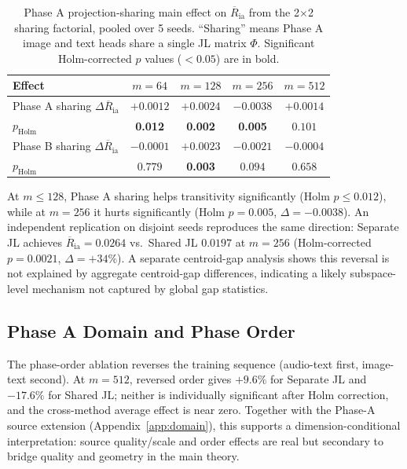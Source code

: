 \documentclass{article}
\newcommand{\avgR}{\overline{R}}
\begin{document}
\begin{table}[ht]
  \caption{Phase A projection-sharing main effect on $\avgR_\mathrm{ia}$ from the 2$\times$2 sharing factorial, pooled over 5 seeds.
  ``Sharing'' means Phase A image and text heads share a single JL matrix $\Phi$.
  Significant Holm-corrected $p$ values (${<}0.05$) are in bold.}
  \label{tab:sharing}
  \centering
  \footnotesize
  \begin{tabular}{lcccc}
    \toprule
    Effect & $m=64$ & $m=128$ & $m=256$ & $m=512$ \\
    \midrule
    Phase A sharing $\Delta\avgR_\mathrm{ia}$ & $+0.0012$ & $+0.0024$ & $-0.0038$ & $+0.0014$ \\
    $p_\mathrm{Holm}$ & \bf{0.012} & \bf{0.002} & \bf{0.005} & $0.101$ \\
    Phase B sharing $\Delta\avgR_\mathrm{ia}$ & $-0.0001$ & $+0.0023$ & $-0.0021$ & $-0.0004$ \\
    $p_\mathrm{Holm}$ & $0.779$ & \bf{0.003} & $0.094$ & $0.658$ \\
    \bottomrule
  \end{tabular}
\end{table}

At $m \leq 128$, Phase A sharing helps transitivity significantly (Holm $p \leq 0.012$), while at $m=256$ it hurts significantly (Holm $p=0.005$, $\Delta=-0.0038$).
An independent replication on disjoint seeds reproduces the same direction: Separate JL achieves $\avgR_\mathrm{ia}=0.0264$ vs.\ Shared JL $0.0197$ at $m=256$ (Holm-corrected $p=0.0021$, $\Delta=+34\%$).
A separate centroid-gap analysis shows this reversal is not explained by aggregate centroid-gap differences, indicating a likely subspace-level mechanism not captured by global gap statistics.

\subsection{Phase A Domain and Phase Order}
\label{sec:phase}
The phase-order ablation reverses the training sequence (audio-text first, image-text second).
At $m=512$, reversed order gives $+9.6\%$ for Separate JL and $-17.6\%$ for Shared JL; neither is individually significant after Holm correction, and the cross-method average effect is near zero.
Together with the Phase-A source extension (Appendix~\ref{app:domain}), this supports a dimension-conditional interpretation: source quality/scale and order effects are real but secondary to bridge quality and geometry in the main theory.
\end{document}
